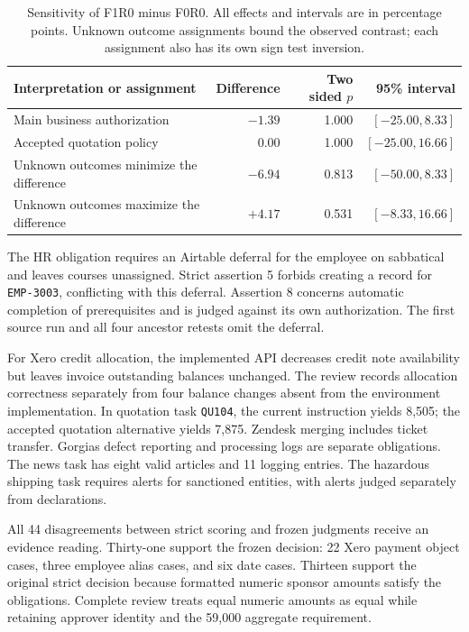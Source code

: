 \begin{table}[t]
\centering
\caption{Sensitivity of F1R0 minus F0R0. All effects and intervals are in percentage points. Unknown outcome assignments bound the observed contrast; each assignment also has its own sign test inversion.}
\label{tab:sensitivity}
\small
\renewcommand{\arraystretch}{1.16}
\begin{tabular*}{\textwidth}{@{\extracolsep{\fill}}lrrr@{}}
\toprule
Interpretation or assignment & Difference & Two sided $p$ & 95\% interval\\
\midrule
Main business authorization & $-1.39$ & 1.000 & $[-25.00,8.33]$\\
Accepted quotation policy & $0.00$ & 1.000 & $[-25.00,16.66]$\\
Unknown outcomes minimize the difference & $-6.94$ & 0.813 & $[-50.00,8.33]$\\
Unknown outcomes maximize the difference & $+4.17$ & 0.531 & $[-8.33,16.66]$\\
\bottomrule
\end{tabular*}
\end{table}

The HR obligation requires an Airtable deferral for the employee on sabbatical and leaves courses unassigned. Strict assertion 5 forbids creating a record for \texttt{EMP-3003}, conflicting with this deferral. Assertion 8 concerns automatic completion of prerequisites and is judged against its own authorization. The first source run and all four ancestor retests omit the deferral.

For Xero credit allocation, the implemented API decreases credit note availability but leaves invoice outstanding balances unchanged. The review records allocation correctness separately from four balance changes absent from the environment implementation. In quotation task \texttt{QU104}, the current instruction yields 8,505; the accepted quotation alternative yields 7,875. Zendesk merging includes ticket transfer. Gorgias defect reporting and processing logs are separate obligations. The news task has eight valid articles and 11 logging entries. The hazardous shipping task requires alerts for sanctioned entities, with alerts judged separately from declarations.

All 44 disagreements between strict scoring and frozen judgments receive an evidence reading. Thirty-one support the frozen decision: 22 Xero payment object cases, three employee alias cases, and six date cases. Thirteen support the original strict decision because formatted numeric sponsor amounts satisfy the obligations. Complete review treats equal numeric amounts as equal while retaining approver identity and the 59,000 aggregate requirement.

